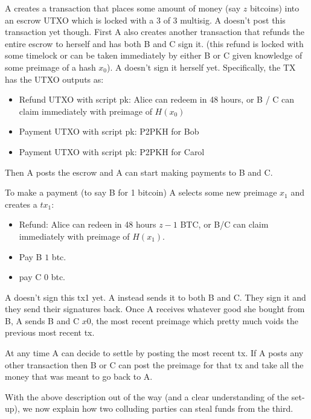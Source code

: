 \documentclass[12pt]{exam}
\begin{document}
\begin{questions}
\begin{solution}
  A creates a transaction that places some amount of money (say $z$ bitcoins) into an escrow UTXO which is locked with a 3 of 3 multisig. A doesn't post this transaction yet though. First A also creates another transaction that refunds the entire escrow to herself and has both B and C sign it. (this refund is locked with some timelock or can be taken immediately by either B or C given knowledge of some preimage of a hash $x_0$). A doesn't sign it herself yet. Specifically, the TX has the UTXO outputs as:
  \begin{itemize}
      \item Refund UTXO with script pk: Alice can redeem in 48 hours, or B / C can claim immediately with preimage of $H(x_0)$
      \item Payment UTXO with script pk: P2PKH for Bob
      \item Payment UTXO with script pk: P2PKH for Carol
    \end{itemize}
  
  Then A posts the escrow and A can start making payments to B and C.

  To make a payment (to say B for 1 bitcoin) A selects some new preimage $x_1$ and creates a $tx_1$:
  \begin{itemize}
    \item Refund: Alice can redeen in 48 hours $z-1$ BTC, or B/C can claim immediately with preimage of $H(x_1)$.
    \item Pay B $1$ btc.
    \item pay C $0$ btc.
  \end{itemize}
  A doesn't sign this tx1 yet. A instead sends it to both B and C. They sign it and they send their signatures back. Once A receives whatever good she bought from B, A sends B and C $x0$, the most recent preimage which pretty much voids the previous most recent tx.

  At any time A can decide to settle by posting the most recent tx. If A posts any other transaction then B or C can post the preimage for that tx and take all the money that was meant to go back to A.

  With the above description out of the way (and a clear understanding of the set-up), we now explain how two colluding parties can steal funds from the third. 


\end{solution}
\end{questions}
\end{document}
